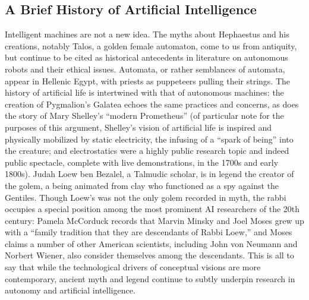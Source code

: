 \subsection{A Brief History of Artificial Intelligence}
Intelligent machines are not a new idea. The myths about Hephaestus and
his creations, notably Talos, a golden female automaton, come to us
from antiquity,\cite{mccorduck}  but continue to be cited as historical antecedents in
literature on autonomous robots and their ethical issues.\cite[p. 3]{patricklin} Automata,
or rather semblances of automata, appear in Hellenic Egypt, with
priests as puppeteers pulling their strings.\cite[Ch. 1]{mccorduck} The history of
artificial life is intertwined with that of autonomous machines: the
creation of Pygmalion's Galatea echoes the same practices and
concerns, as does the story of Mary Shelley's “modern Prometheus” (of
particular note for the purposes of this argument, Shelley's vision of
artificial life is inspired and physically mobilized by static
electricity, the infusing of a ``spark of being'' into the creature; and
electrostatics were a highly public research topic and indeed public
spectacle, complete with live demonstrations, in the 1700s and early
1800s).\cite[p. 44]{shelley} Judah Loew ben Bezalel, a Talmudic scholar, is in legend the
creator of the golem, a being animated from clay who functioned as a
spy against the Gentiles.\cite[Ch. 1]{mccorduck} Though Loew's was not the only golem
recorded in myth, the rabbi occupies a special position among the most
prominent AI researchers of the 20th century: Pamela McCorduck records
that Marvin Minsky and Joel Moses grew up with a ``family tradition
that they are descendants of Rabbi Loew,'' and Moses claims a number of
other American scientists, including John von Neumann and Norbert
Wiener, also consider themselves among the descendants.\cite[Ch. 1]{mccorduck} This is all
to say that while the technological drivers of conceptual visions are
more contemporary, ancient myth and legend continue to subtly underpin
research in autonomy and artificial intelligence.

